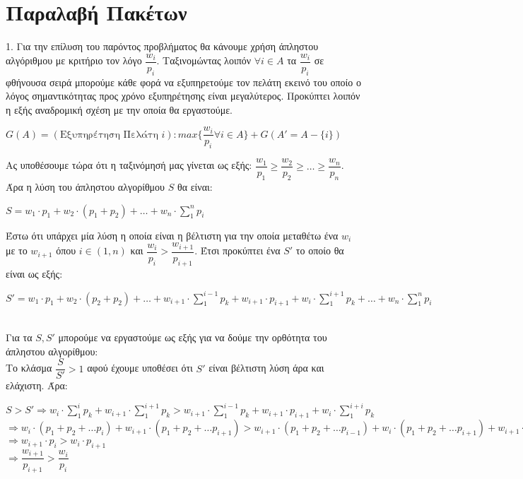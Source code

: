 \documentclass{article} \usepackage[greek,english]{babel}
\begin{document}
\pagebreak

\section{Παραλαβή Πακέτων}
1. Για την επίλυση του παρόντος προβλήματος θα κάνουμε χρήση άπληστου αλγόριθμου με κριτήριο τον
λόγο $\dfrac{w_i}{p_i}$. Ταξινομώντας λοιπόν $\forall i \in A$ τα $\dfrac{w_i}{p_i}$ σε φθήνουσα σειρά
μπορούμε κάθε φορά να εξυπηρετούμε τον πελάτη εκεινό του οποίο ο λόγος σημαντικότητας προς χρόνο
εξυπηρέτησης είναι μεγαλύτερος. Προκύπτει λοιπόν η εξής αναδρομική σχέση με την οποία θα
εργαστούμε. \\ \break
\begin{center}
    $G(A)=(\text{Εξυπηρέτηση Πελάτη $i$}) : max\{\dfrac{w_i}{p_i}\forall i \in A\}+G(A'=A-\{i\})$ \\
\end{center}

Ας υποθέσουμε τώρα ότι η ταξινόμησή μας γίνεται ως εξής:
$\dfrac{w_1}{p_1} \ge \dfrac{w_2}{p_2} \ge \dots \ge \dfrac{w_n}{p_n}$. 
Άρα η λύση του άπληστου αλγορίθμου $S$ θα είναι: \\
\begin{center}
    $S=w_1 \cdot p_1 + w_2 \cdot (p_1 + p_2) + \dots + w_n \cdot \sum_1^n{p_i}$ \\
\end{center} 

Έστω ότι υπάρχει μία λύση η οποία είναι η βέλτιστη για την οποία μεταθέτω ένα $w_i$ με το
$w_{i+1}$ όπου $i \in (1,n)$ και $\dfrac{w_i}{p_i} > \dfrac{w_{i+1}}{p_{i+1}}$. 
Έτσι προκύπτει ένα $S'$ το οποίο θα είναι ως εξής: \\
\begin{center}
    $S'= w_1 \cdot p_1 + w_2 \cdot (p_2 + p_2) + \dots + w_{i+1}\cdot \sum_1^{i-1}{p_k} + w_{i+1}\cdot
    p_{i+1}+ w_{i}\cdot \sum_1^{i+1}{p_k} + \dots  + w_n \cdot \sum_1^n{p_i}$
\end{center} \\
Για τα $S,S'$ μπορούμε να εργαστούμε ως εξής για να δούμε την ορθότητα του άπληστου αλγορίθμου: \\
Το κλάσμα $\dfrac{S}{S'} > 1$ αφού έχουμε υποθέσει ότι $S'$ είναι βέλτιστη λύση άρα και ελάχιστη.
Άρα: \\
\begin{center}
    $S > S' \Rightarrow 
    w_i \cdot \sum_1^i{p_k} + w_{i+1} \cdot \sum_1^{i+1}{p_k} > w_{i+1} \cdot \sum_1^{i-1}{p_k}
    + w_{i+1} \cdot p_{i+1} + w_{i} \cdot \sum_1^{i+i}{p_k}$ \\
    $ \Rightarrow w_i\cdot(p_1 + p_2 + \dots p_i) + w_{i+1}\cdot(p_1 + p_2 + \dots p_{i+1}) >
    w_{i+1}\cdot(p_1 + p_2 + \dots p_{i-1}) +
    w_{i}\cdot(p_1 + p_2 + \dots p_{i+1}) + w_{i+1} \cdot p_{i+1}$\\
    $\Rightarrow w_{i+1}\cdot p_i > w_i\cdot p_{i+1}$ \\
    $\text{  } $\\
  $\Rightarrow \dfrac{w_{i+1}}{p_{i+1}} > \dfrac{w_i}{p_i}$
\end{center}
\end{document}
